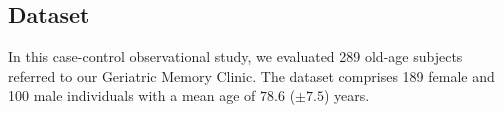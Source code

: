 \documentclass{standalone}
\begin{document}
\subsection[Dataset]{Dataset}\label{cytokine_data}

In this case-control observational study, we evaluated 289 old-age subjects referred to our Geriatric Memory Clinic.
The dataset comprises 189 female and 100 male individuals with a mean age of $78.6$ ($\pm7.5$) years.

\end{document}
